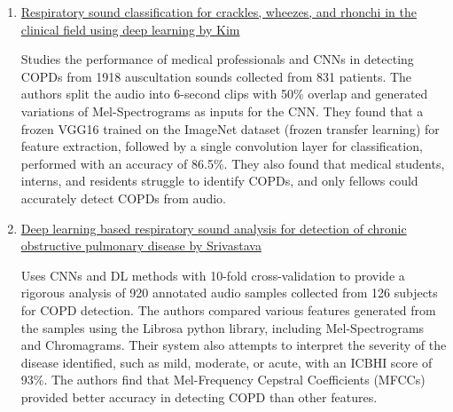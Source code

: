 \documentclass[10pt,twocolumn,letterpaper]{article}
\begin{document}
\begin{enumerate}
    \item
    \href{https://www.nature.com/articles/s41598-021-96724-7}{Respiratory sound classification for crackles,
    wheezes, and rhonchi in the clinical field using deep learning by Kim \etal}

    Studies the performance of medical professionals and CNNs in detecting COPDs from 1918 auscultation sounds
    collected from 831 patients. The authors split the audio into 6-second clips with 50\% overlap and generated
    variations of Mel-Spectrograms as inputs for the CNN. They found that a frozen VGG16 trained on the ImageNet
    dataset (frozen transfer learning) for feature extraction, followed by a single convolution layer for
    classification, performed with an accuracy of 86.5\%. They also found that medical students, interns, and
    residents struggle to identify COPDs, and only fellows could accurately detect COPDs from audio.

    \item
    \href{https://www.ncbi.nlm.nih.gov/pmc/articles/PMC7959628/}{Deep learning based respiratory sound analysis for
    detection of chronic obstructive pulmonary disease by Srivastava \etal}

    Uses CNNs and DL methods with 10-fold cross-validation to provide a rigorous analysis of 920 annotated audio
    samples collected from 126 subjects for COPD detection. The authors compared various features generated
    from the samples using the Librosa python library, including Mel-Spectrograms and Chromagrams. Their system
    also attempts to interpret the severity of the disease identified, such as mild, moderate, or acute, with an
    ICBHI score of 93\%. The authors find that Mel-Frequency Cepstral Coefficients (MFCCs) provided better accuracy
    in detecting COPD than other features.


\end{enumerate}
\end{document}
